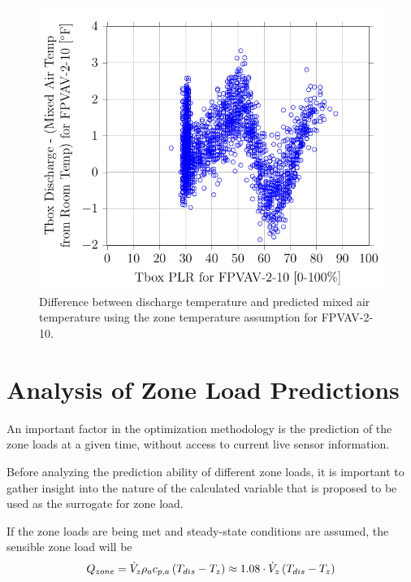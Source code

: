\begin{figure}
\centering
\includegraphics[]{Plots/2017-01-10-0906-TboxDischargeMixedAirTempfromRoomTempforFPVAV210vsTboxPLRforFPVAV210.pdf}
\caption{Difference between discharge temperature and predicted mixed
air temperature using the zone temperature assumption for FPVAV-2-10.}
\label{fig:2017-01-10-0906-TboxDischargeMixedAirTempfromRoomTempforFPVAV210vsTboxPLRforFPVAV210}
\end{figure}




\section{Analysis of Zone Load Predictions}

An important factor in the optimization methodology is the prediction of
the zone loads at a given time, without access to current live sensor
information. 

Before analyzing the prediction ability of different zone loads, it is
important to gather insight into the nature of the calculated variable
that is proposed to be used as the surrogate for zone load.   

If the zone loads are being met and steady-state conditions are assumed,
the sensible zone load will be
\begin{equation}
    Q_{zone}=\dot{V}_{z} \rho_a c_{p,a}{} \left(T_{dis}-T_{z} \right) \approx 1.08 \cdot \dot{V}_{z}\left(T_{dis}-T_{z} \right)
\end{equation}

